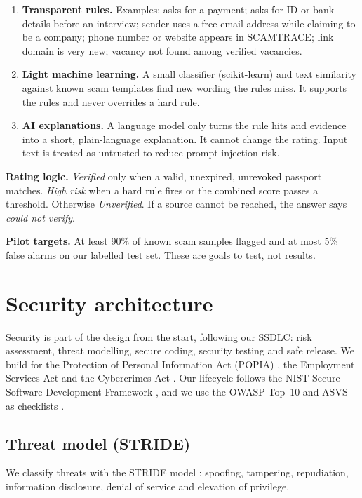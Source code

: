 \documentclass[11pt,a4paper]{article}
\begin{document}
\begin{enumerate}
  \item \textbf{Transparent rules.} Examples: asks for a payment; asks for ID or bank details before an interview; sender uses a free email address while claiming to be a company; phone number or website appears in SCAMTRACE; link domain is very new; vacancy not found among verified vacancies.
  \item \textbf{Light machine learning.} A small classifier (scikit-learn) and text similarity against known scam templates find new wording the rules miss. It supports the rules and never overrides a hard rule.
  \item \textbf{AI explanations.} A language model only turns the rule hits and evidence into a short, plain-language explanation. It cannot change the rating. Input text is treated as untrusted to reduce prompt-injection risk.
\end{enumerate}

\textbf{Rating logic.} \emph{Verified} only when a valid, unexpired, unrevoked passport matches. \emph{High risk} when a hard rule fires or the combined score passes a threshold. Otherwise \emph{Unverified}. If a source cannot be reached, the answer says \emph{could not verify}.

\textbf{Pilot targets.} At least 90\% of known scam samples flagged and at most 5\% false alarms on our labelled test set. These are goals to test, not results.

\section{Security architecture}
\label{sec:security}
Security is part of the design from the start, following our SSDLC: risk assessment, threat modelling, secure coding, security testing and safe release. We build for the Protection of Personal Information Act (POPIA) \cite{popia}, the Employment Services Act \cite{esa} and the Cybercrimes Act \cite{cca}. Our lifecycle follows the NIST Secure Software Development Framework \cite{ssdf}, and we use the OWASP Top~10 and ASVS as checklists \cite{owasp}.

\subsection{Threat model (STRIDE)}
We classify threats with the STRIDE model \cite{stride}: spoofing, tampering, repudiation, information disclosure, denial of service and elevation of privilege.
\end{document}
